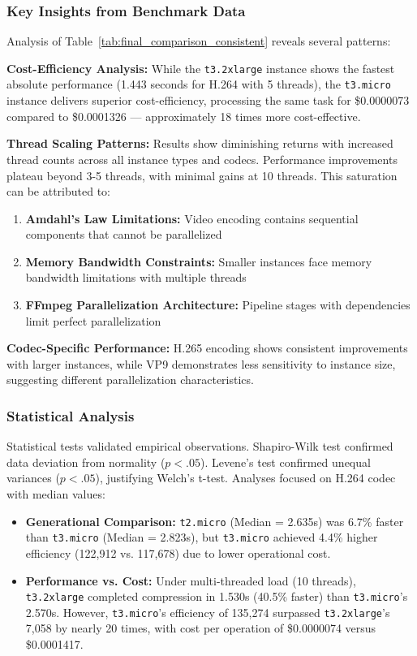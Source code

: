 \documentclass[conference]{IEEEtran}
\begin{document}
	\subsubsection{Key Insights from Benchmark Data}
	
	Analysis of Table~\ref{tab:final_comparison_consistent} reveals several patterns:
	
	\textbf{Cost-Efficiency Analysis:} While the \texttt{t3.2xlarge} instance shows the fastest absolute performance (1.443 seconds for H.264 with 5 threads), the \texttt{t3.micro} instance delivers superior cost-efficiency, processing the same task for \$0.0000073 compared to \$0.0001326 — approximately 18 times more cost-effective.
	
	\textbf{Thread Scaling Patterns:} Results show diminishing returns with increased thread counts across all instance types and codecs. Performance improvements plateau beyond 3-5 threads, with minimal gains at 10 threads. This saturation can be attributed to:
	\begin{enumerate}
		\item \textbf{Amdahl's Law Limitations:} Video encoding contains sequential components that cannot be parallelized
		\item \textbf{Memory Bandwidth Constraints:} Smaller instances face memory bandwidth limitations with multiple threads
		\item \textbf{FFmpeg Parallelization Architecture:} Pipeline stages with dependencies limit perfect parallelization
	\end{enumerate}
	
	\textbf{Codec-Specific Performance:} H.265 encoding shows consistent improvements with larger instances, while VP9 demonstrates less sensitivity to instance size, suggesting different parallelization characteristics.
	
	\subsubsection{Statistical Analysis}
	
	Statistical tests validated empirical observations. Shapiro-Wilk test confirmed data deviation from normality ($p < .05$). Levene's test confirmed unequal variances ($p < .05$), justifying Welch's t-test. Analyses focused on H.264 codec with median values:
	
	\begin{itemize}
		\item \textbf{Generational Comparison:} \texttt{t2.micro} (Median = 2.635s) was 6.7\% faster than \texttt{t3.micro} (Median = 2.823s), but \texttt{t3.micro} achieved 4.4\% higher efficiency (122,912 vs. 117,678) due to lower operational cost.
		
		\item \textbf{Performance vs. Cost:} Under multi-threaded load (10 threads), \texttt{t3.2xlarge} completed compression in 1.530s (40.5\% faster) than \texttt{t3.micro}'s 2.570s. However, \texttt{t3.micro}'s efficiency of 135,274 surpassed \texttt{t3.2xlarge}'s 7,058 by nearly 20 times, with cost per operation of \$0.0000074 versus \$0.0001417.
	\end{itemize}
	
\end{document}
